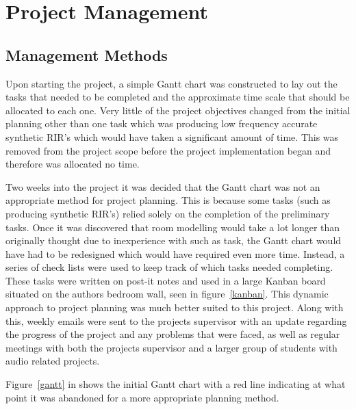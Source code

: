 \documentclass[../../main.tex]{subfiles}
\begin{document}
\section{Project Management}
	\subsection{Management Methods}
	Upon starting the project, a simple Gantt chart was constructed to lay out the tasks that needed to be completed and the approximate time scale that should be allocated to each one. Very little of the project objectives changed from the initial planning other than one task which was producing low frequency accurate synthetic \ac{RIR}'s which would have taken a significant amount of time. This was removed from the project scope before the project implementation began and therefore was allocated no time.

	Two weeks into the project it was decided that the Gantt chart was not an appropriate method for project planning. This is because some tasks (such as producing synthetic \ac{RIR}'s) relied solely on the completion of the preliminary tasks. Once it was discovered that room modelling would take a lot longer than originally thought due to inexperience with such as task, the Gantt chart would have had to be redesigned which would have required even more time. Instead, a series of check lists were used to keep track of which tasks needed completing. These tasks were written on post-it notes and used in a large Kanban board situated on the authors bedroom wall, seen in figure~\ref{kanban}. This dynamic approach to project planning was much better suited to this project.  Along with this, weekly emails were sent to the projects supervisor with an update regarding the progress of the project and any problems that were faced, as well as regular meetings with both the projects supervisor and a larger group of students with audio related projects.

	Figure~\ref{gantt} in  shows the initial Gantt chart with a red line indicating at what point it was abandoned for a more appropriate planning method.
\end{document}
